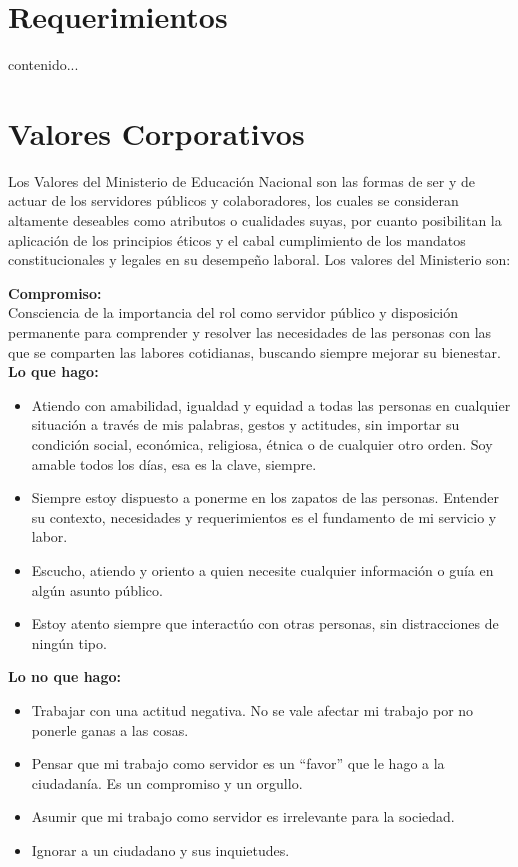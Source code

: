 \section{Requerimientos}
contenido...

\section{Valores Corporativos}
Los Valores del Ministerio de Educación Nacional son las formas de ser y de actuar de los servidores públicos y colaboradores, los cuales se consideran altamente deseables como atributos o cualidades suyas, por cuanto posibilitan la aplicación de los principios éticos y el cabal cumplimiento de los mandatos constitucionales y legales en su desempeño laboral. Los valores del Ministerio son: 


\textbf{Compromiso:} \\
Consciencia de la importancia del rol como servidor público y disposición permanente para comprender y resolver las necesidades de las personas con las que se comparten las labores cotidianas, buscando siempre mejorar su bienestar. \\

\textbf{Lo que hago: }
\begin{itemize}
	\item Atiendo con amabilidad, igualdad y equidad a todas las personas en cualquier situación a través de mis palabras, gestos y actitudes, sin importar su condición social, económica, religiosa, étnica o de cualquier otro orden. Soy amable todos los días, esa es la clave, siempre.
	\item Siempre estoy dispuesto a ponerme en los zapatos de las personas. Entender su contexto, necesidades y requerimientos es el fundamento de mi servicio y labor. 
	\item Escucho, atiendo y oriento a quien necesite cualquier información o guía en algún asunto público. 
	\item Estoy atento siempre que interactúo con otras personas, sin distracciones de ningún tipo. 
\end{itemize}

\textbf{Lo no que hago: }
\begin{itemize}
	\item Trabajar con una actitud negativa. No se vale afectar mi trabajo por no ponerle ganas a las cosas. 
	\item Pensar que mi trabajo como servidor es un “favor” que le hago a la ciudadanía. Es un compromiso y un orgullo. 
	\item Asumir que mi trabajo como servidor es irrelevante para la sociedad.
	\item Ignorar a un ciudadano y sus inquietudes. 
\end{itemize}

